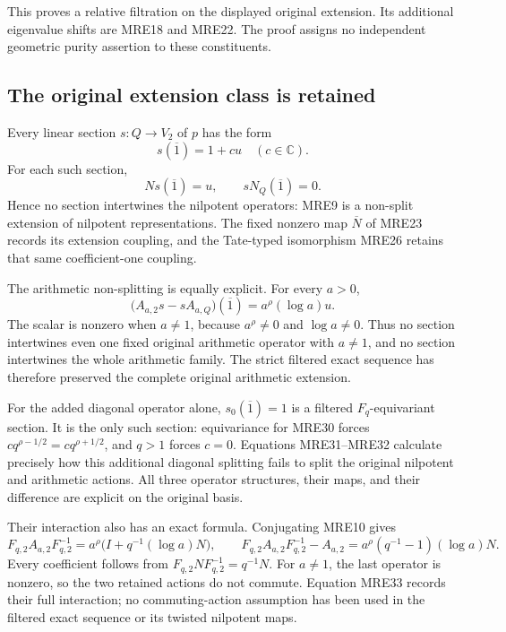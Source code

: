 This proves a relative filtration on the displayed original extension.
Its additional eigenvalue shifts are MRE18 and MRE22. The proof assigns
no independent geometric purity assertion to these constituents.

\subsection{The original extension class is retained}

Every linear section \(s:Q\to V_2\) of \(p\) has the form
\[
 s(\overline{1})=1+c u\quad(c\in\mathbb C).
 \tag{MRE30}
\]
For each such section,
\[
 Ns(\overline{1})=u,\qquad sN_Q(\overline{1})=0.
 \tag{MRE31}
\]
Hence no section intertwines the nilpotent operators: MRE9 is a
non-split extension of nilpotent representations. The fixed nonzero map
\(\overline N\) of MRE23 records its extension coupling, and the
Tate-typed isomorphism MRE26 retains that same coefficient-one coupling.

The arithmetic non-splitting is equally explicit. For every \(a>0\),
\[
 \bigl(A_{a,2}s-sA_{a,Q}\bigr)(\overline{1})
       =a^\rho(\log a)u.
 \tag{MRE32}
\]
The scalar is nonzero when \(a\ne1\), because \(a^\rho\ne0\) and
\(\log a\ne0\). Thus no section intertwines even one fixed original
arithmetic operator with \(a\ne1\), and no section intertwines the
whole arithmetic family. The strict filtered exact sequence has
therefore preserved the complete original arithmetic extension.

For the added diagonal operator alone, \(s_0(\overline{1})=1\) is a
filtered \(F_q\)-equivariant section. It is the only such section:
equivariance for MRE30 forces
\(c q^{\rho-1/2}=c q^{\rho+1/2}\), and \(q>1\) forces \(c=0\).
Equations MRE31--MRE32 calculate precisely how this additional
diagonal splitting fails to split the original nilpotent and arithmetic
actions. All three operator structures, their maps, and their difference
are explicit on the original basis.

Their interaction also has an exact formula. Conjugating MRE10 gives
\[
 F_{q,2}A_{a,2}F_{q,2}^{-1}
   =a^\rho\bigl(I+q^{-1}(\log a)N\bigr),\qquad
 F_{q,2}A_{a,2}F_{q,2}^{-1}-A_{a,2}
   =a^\rho(q^{-1}-1)(\log a)N.
 \tag{MRE33}
\]
Every coefficient follows from \(F_{q,2}NF_{q,2}^{-1}=q^{-1}N\).
For \(a\ne1\), the last operator is nonzero, so the two retained
actions do not commute. Equation MRE33 records their full interaction;
no commuting-action assumption has been used in the filtered exact
sequence or its twisted nilpotent maps.

